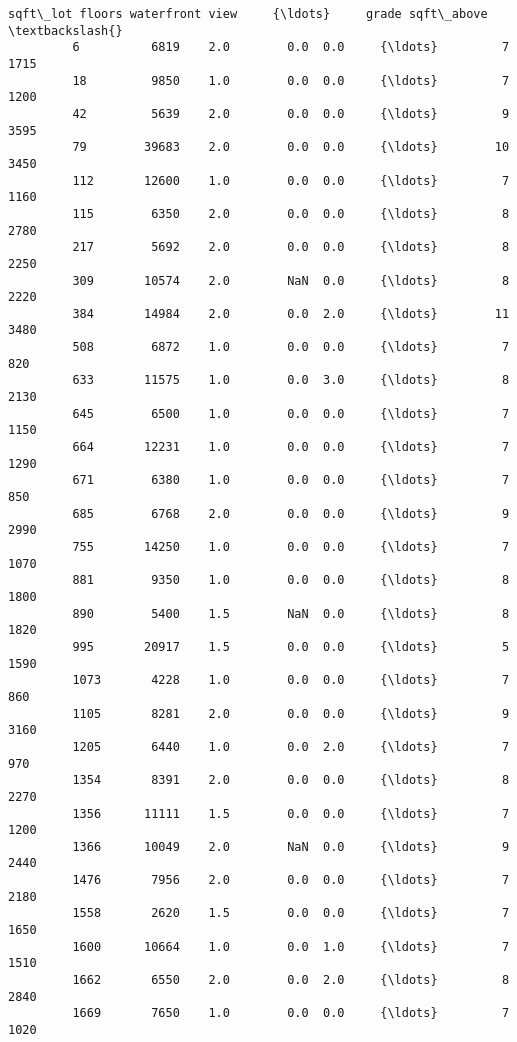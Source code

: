 \documentclass[11pt]{article}
\begin{document}
\begin{Verbatim}[commandchars=\\\{\}]
                sqft\_lot floors waterfront view     {\ldots}     grade sqft\_above  \textbackslash{}
         6          6819    2.0        0.0  0.0     {\ldots}         7       1715   
         18         9850    1.0        0.0  0.0     {\ldots}         7       1200   
         42         5639    2.0        0.0  0.0     {\ldots}         9       3595   
         79        39683    2.0        0.0  0.0     {\ldots}        10       3450   
         112       12600    1.0        0.0  0.0     {\ldots}         7       1160   
         115        6350    2.0        0.0  0.0     {\ldots}         8       2780   
         217        5692    2.0        0.0  0.0     {\ldots}         8       2250   
         309       10574    2.0        NaN  0.0     {\ldots}         8       2220   
         384       14984    2.0        0.0  2.0     {\ldots}        11       3480   
         508        6872    1.0        0.0  0.0     {\ldots}         7        820   
         633       11575    1.0        0.0  3.0     {\ldots}         8       2130   
         645        6500    1.0        0.0  0.0     {\ldots}         7       1150   
         664       12231    1.0        0.0  0.0     {\ldots}         7       1290   
         671        6380    1.0        0.0  0.0     {\ldots}         7        850   
         685        6768    2.0        0.0  0.0     {\ldots}         9       2990   
         755       14250    1.0        0.0  0.0     {\ldots}         7       1070   
         881        9350    1.0        0.0  0.0     {\ldots}         8       1800   
         890        5400    1.5        NaN  0.0     {\ldots}         8       1820   
         995       20917    1.5        0.0  0.0     {\ldots}         5       1590   
         1073       4228    1.0        0.0  0.0     {\ldots}         7        860   
         1105       8281    2.0        0.0  0.0     {\ldots}         9       3160   
         1205       6440    1.0        0.0  2.0     {\ldots}         7        970   
         1354       8391    2.0        0.0  0.0     {\ldots}         8       2270   
         1356      11111    1.5        0.0  0.0     {\ldots}         7       1200   
         1366      10049    2.0        NaN  0.0     {\ldots}         9       2440   
         1476       7956    2.0        0.0  0.0     {\ldots}         7       2180   
         1558       2620    1.5        0.0  0.0     {\ldots}         7       1650   
         1600      10664    1.0        0.0  1.0     {\ldots}         7       1510   
         1662       6550    2.0        0.0  2.0     {\ldots}         8       2840   
         1669       7650    1.0        0.0  0.0     {\ldots}         7       1020   

\end{Verbatim}
\end{document}
